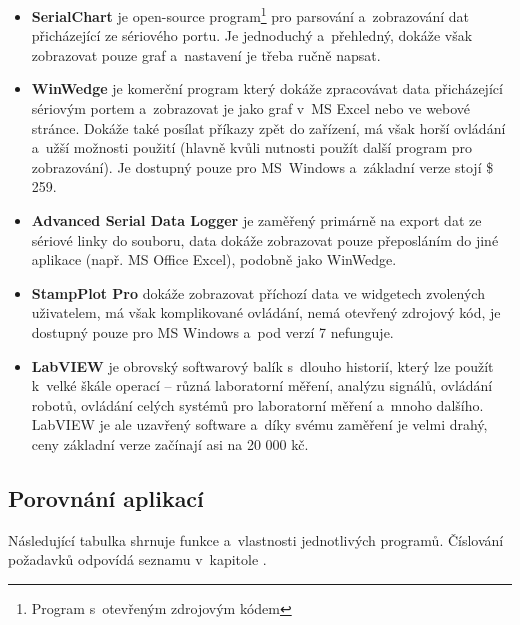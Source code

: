 \documentclass[12pt, a4paper, oneside]{article}
\begin{document}
\begin{itemize}
    \item {\bf SerialChart}\cite{serialchart} je open-source program\footnote{Program s~otevřeným zdrojovým kódem} pro parsování a~zobrazování dat přicházející ze sériového portu. Je jednoduchý a~přehledný, dokáže však zobrazovat pouze graf a~nastavení je třeba ručně napsat.
    \item {\bf WinWedge}\cite{winwedge} je komerční program který dokáže zpracovávat data přicházející sériovým portem a~zobrazovat je jako graf v~MS Excel nebo ve webové stránce. Dokáže také posílat příkazy zpět do zařízení, má však horší ovládání a~užší možnosti použití (hlavně kvůli nutnosti použít další program pro zobrazování). Je dostupný pouze pro MS~Windows a~základní verze stojí \$ 259.
    \item {\bf Advanced Serial Data Logger}\cite{serialdatalogger} je zaměřený primárně na export dat ze sériové linky do souboru, data dokáže zobrazovat pouze přeposláním do jiné aplikace (např. MS Office Excel), podobně jako WinWedge.
    \item {\bf StampPlot Pro}\cite{stamplot} dokáže zobrazovat příchozí data ve widgetech zvolených uživatelem, má však komplikované ovládání, nemá otevřený zdrojový kód, je dostupný pouze pro MS Windows a~pod verzí 7 nefunguje.
    \item {\bf LabVIEW}\cite{labview} je obrovský softwarový balík s~dlouho historií, který lze použít k~velké škále operací -- různá laboratorní měření, analýzu signálů, ovládání robotů, ovládání celých systémů pro laboratorní měření a~mnoho dalšího. LabVIEW je ale uzavřený software a~díky svému zaměření je velmi drahý, ceny základní verze začínají asi na 20 000 kč.
\end{itemize}

\newpage
\subsection{Porovnání aplikací}
Následující tabulka shrnuje funkce a~vlastnosti jednotlivých programů. Číslování požadavků odpovídá seznamu v~kapitole .

\vspace{5mm}
\end{document}
